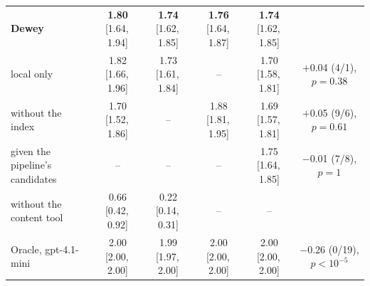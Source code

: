 \documentclass[conference]{IEEEtran}
\newcommand{\ci}[2]{{\scriptsize[#1,\,#2]}}
\begin{document}
\begin{table}[t]
\begin{tabular}{lccccc}
\midrule
\textbf{Dewey} & \textbf{1.80} \ci{1.64}{1.94} & \textbf{1.74} \ci{1.62}{1.85} & \textbf{1.76} \ci{1.64}{1.87} & \textbf{1.74} \ci{1.62}{1.85} & \\
\quad local only & 1.82 \ci{1.66}{1.96} & 1.73 \ci{1.61}{1.84} & -- & 1.70 \ci{1.58}{1.81} & $+$0.04 (4/1), $p=0.38$ \\
\quad without the index & 1.70 \ci{1.52}{1.86} & -- & 1.88 \ci{1.81}{1.95} & 1.69 \ci{1.57}{1.81} & $+$0.05 (9/6), $p=0.61$ \\
\quad given the pipeline's candidates & -- & -- & -- & 1.75 \ci{1.64}{1.85} & $-$0.01 (7/8), $p=1$ \\
\quad without the content tool & 0.66 \ci{0.42}{0.92} & 0.22 \ci{0.14}{0.31} & -- & -- & \\
\midrule
Oracle, gpt-4.1-mini & 2.00 \ci{2.00}{2.00} & 1.99 \ci{1.97}{2.00} & 2.00 \ci{2.00}{2.00} & 2.00 \ci{2.00}{2.00} & $-$0.26 (0/19), $p<10^{-5}$ \\
\bottomrule
\end{tabular}
\end{table}
\end{document}
